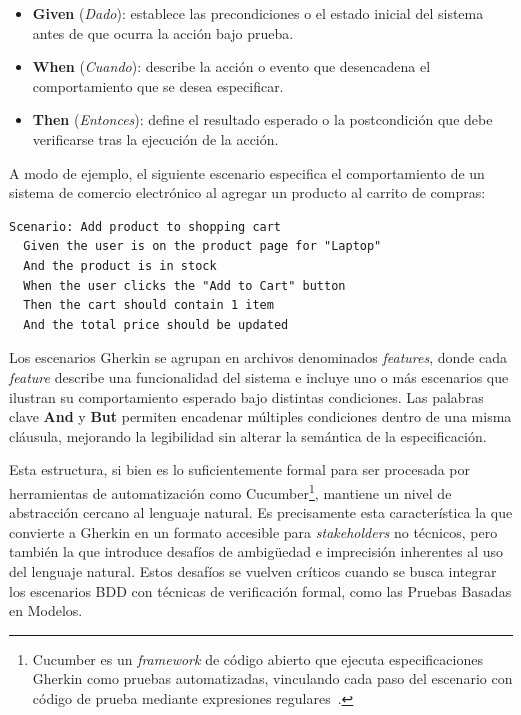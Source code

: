 \begin{itemize}
  \item \textbf{Given} (\textit{Dado}): establece las precondiciones o el estado inicial del sistema antes de que ocurra la acción bajo prueba.
  \item \textbf{When} (\textit{Cuando}): describe la acción o evento que desencadena el comportamiento que se desea especificar.
  \item \textbf{Then} (\textit{Entonces}): define el resultado esperado o la postcondición que debe verificarse tras la ejecución de la acción.
\end{itemize}

A modo de ejemplo, el siguiente escenario especifica el comportamiento de un sistema de comercio electrónico al agregar un producto al carrito de compras:
\begin{samepage}
\begin{center}
\begin{minipage}{0.95\textwidth}
\captionsetup{type=lstlisting}
\caption{Ejemplo de un escenario BDD en sintaxis Gherkin}
\label{lst:gherkin-example}
\begin{lstlisting}
Scenario: Add product to shopping cart
  Given the user is on the product page for "Laptop"
  And the product is in stock
  When the user clicks the "Add to Cart" button
  Then the cart should contain 1 item
  And the total price should be updated
\end{lstlisting}
\end{minipage}
\end{center}
\end{samepage}

Los escenarios Gherkin se agrupan en archivos denominados \textit{features}, donde cada \textit{feature} describe una funcionalidad del sistema e incluye uno o más escenarios que ilustran su comportamiento esperado bajo distintas condiciones. Las palabras clave \textbf{And} y \textbf{But} permiten encadenar múltiples condiciones dentro de una misma cláusula, mejorando la legibilidad sin alterar la semántica de la especificación.

Esta estructura, si bien es lo suficientemente formal para ser procesada por herramientas de automatización como Cucumber\footnote{Cucumber es un \textit{framework} de código abierto que ejecuta especificaciones Gherkin como pruebas automatizadas, vinculando cada paso del escenario con código de prueba mediante expresiones regulares~\cite{cucumber}.}, mantiene un nivel de abstracción cercano al lenguaje natural. Es precisamente esta característica la que convierte a Gherkin en un formato accesible para \textit{stakeholders} no técnicos, pero también la que introduce desafíos de ambigüedad e imprecisión inherentes al uso del lenguaje natural. Estos desafíos se vuelven críticos cuando se busca integrar los escenarios BDD con técnicas de verificación formal, como las Pruebas Basadas en Modelos.

